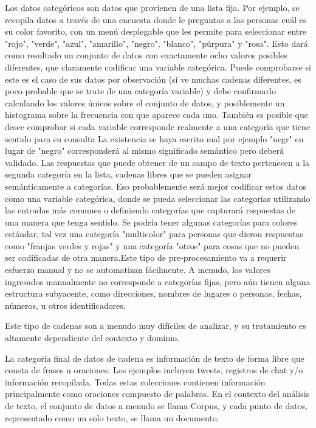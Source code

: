 \documentclass[12pt, runningheads,a4]{book}
\begin{document}
Los datos categóricos son datos que provienen de una lista fija. 
Por ejemplo, se recopila datos a través de una encuesta donde le preguntas a las personas cuál es su color favorito, con un menú desplegable que les permite para seleccionar entre "rojo", "verde", "azul", "amarillo", "negro", "blanco", "púrpura" y "rosa".
Esto dará como resultado un conjunto de datos con exactamente ocho valores posibles diferentes, que claramente codificar una variable categórica. Puede comprobarse si este es el caso de sus datos por observación  (si ve muchas cadenas diferentes, es poco probable que se trate de una categoría variable) y debe confirmarlo calculando los valores únicos sobre el conjunto de datos, y posiblemente un histograma sobre la frecuencia con que aparece cada uno. 
También es posible que desee comprobar si cada variable corresponde realmente a una categoría que tiene sentido para su consulta La existencia se haya escrito mal por ejemplo "negr" en lugar de "negro" corresponderá al mismo significado semántico pero deberá validado.
Las respuestas que puede obtener de un campo de texto pertenecen a la segunda
categoría en la lista, cadenas libres que se pueden asignar semánticamente a categorías. Eso probablemente será mejor codificar estos datos como una variable categórica, donde se pueda seleccionar las categorías utilizando las entradas más comunes o definiendo categorías que capturará respuestas de una manera que tenga sentido. 
Se podría tener algunas categorías para colores estándar, tal vez una categoría "multicolor" para personas que dieron respuestas como "franjas verdes y rojas" y una categoría "otros" para cosas que no pueden ser codificadas de otra manera.Este tipo de pre-procesamiento va a requerir esfuerzo manual y no se automatizan fácilmente.
A menudo, los valores ingresados manualmente no corresponde a categorías fijas, pero aún tienen alguna estructura subyacente, como direcciones, nombres de lugares o personas, fechas, números, u otros identificadores. 

Este tipo de cadenas son a menudo muy difíciles de analizar, y su tratamiento es altamente dependiente del contexto y dominio.

La categoría final de datos de cadena es información de texto de forma libre que consta de frases u oraciones.
Los ejemplos incluyen tweets, registros de chat y/o información recopilada.
Todas estas colecciones contienen información principalmente como oraciones compuesto de palabras.
En el contexto del análisis de texto, el conjunto de datos a menudo se llama Corpus, y cada punto de datos, representado como un solo texto, se llama un documento. 
 
\end{document}
